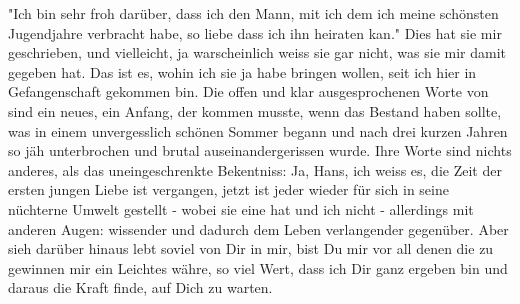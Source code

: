 \def\day{11. Januar 1943}
\mktitle

"Ich bin sehr froh dar\"{u}ber, dass ich den Mann, mit ich dem ich meine sch\"{o}nsten Jugendjahre verbracht habe, so liebe dass ich ihn heiraten kan."
Dies hat sie mir geschrieben, und vielleicht, ja warscheinlich weiss sie gar nicht, was sie mir damit gegeben hat.
Das ist es, wohin ich sie ja habe bringen wollen, seit ich hier in Gefangenschaft gekommen bin.
Die offen und klar ausgesprochenen Worte von sind ein neues, ein Anfang, der kommen musste, wenn das Bestand haben sollte, was in einem unvergesslich sch\"{o}nen Sommer begann und nach drei kurzen Jahren so j\"{a}h unterbrochen und brutal auseinandergerissen wurde.
Ihre Worte sind nichts anderes, als das uneingeschrenkte Bekentniss: Ja, Hans, ich weiss es, die Zeit der ersten jungen Liebe ist vergangen, jetzt ist jeder wieder f\"{u}r sich in seine n\"{u}chterne Umwelt gestellt - wobei sie eine hat und ich nicht - allerdings mit anderen Augen: wissender und dadurch dem Leben verlangender gegen\"{u}ber.
Aber sieh dar\"{u}ber hinaus lebt soviel von Dir in mir, bist Du mir vor all denen die zu gewinnen mir ein Leichtes w\"{a}hre, so viel Wert, dass ich Dir ganz ergeben bin und daraus die Kraft finde, auf Dich zu warten.

\clearpage
